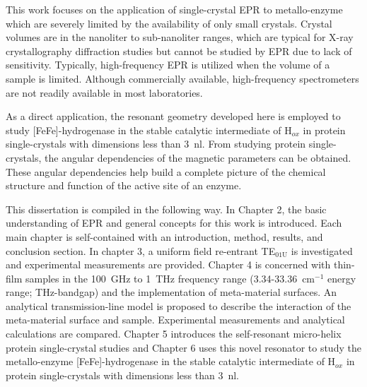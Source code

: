 This work focuses on the application of single-crystal EPR to metallo-enzyme which are severely limited by the availability of only small crystals. Crystal volumes are in the nanoliter to sub-nanoliter ranges, which are typical for X-ray crystallography diffraction studies but cannot be studied by EPR due to lack of sensitivity. Typically, high-frequency EPR is utilized when the volume of a sample is limited. \cite{grinbergVHF} Although commercially available, high-frequency spectrometers are not readily available in most laboratories.

As a direct application, the resonant geometry developed here is employed to study [FeFe]-hydrogenase in the stable catalytic intermediate of H$_{ox}$ in protein single-crystals with dimensions less than 3~nl. From studying protein single-crystals, the angular dependencies of the magnetic parameters can be obtained. These angular dependencies help build a complete picture of the chemical structure and function of the active site of an enzyme.\cite{NiFe1996,NiFe2000,NiFe2003}

This dissertation is compiled in the following way. In Chapter 2, the basic understanding of EPR and general concepts for this work is introduced. Each main chapter is self-contained with an introduction, method, results, and conclusion section. In chapter 3, a uniform field re-entrant TE$_{\text{01U}}$ is investigated and experimental measurements are provided. Chapter 4 is concerned with thin-film samples in the 100~GHz to 1~THz frequency range (3.34-33.36~cm$^{-1}$ energy range; THz-bandgap) and the implementation of meta-material surfaces. An analytical transmission-line model is proposed to describe the interaction of the meta-material surface and sample. Experimental measurements and analytical calculations are compared. Chapter 5 introduces the self-resonant micro-helix protein single-crystal studies and Chapter 6 uses this novel resonator to study the metallo-enzyme [FeFe]-hydrogenase in the stable catalytic intermediate of H$_{ox}$ in protein single-crystals with dimensions less than 3~nl.

{\renewcommand{\bibsection}{\clearpage\section*{\bibname}\markboth{\bibname}{\bibname}}
\renewcommand{\bibname}{CHAPTER 1. REFERENCES}


}